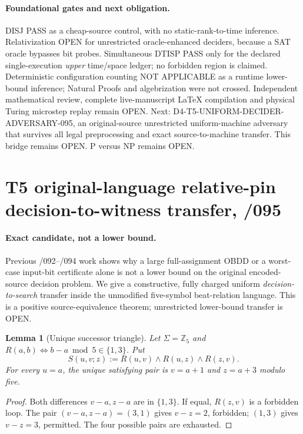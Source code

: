 \documentclass[11pt]{article}
\newtheorem{lemma}{Lemma}
\begin{document}
\paragraph{Foundational gates and next obligation.}
DISJ PASS as a cheap-source control, with no static-rank-to-time
inference. Relativization OPEN for unrestricted oracle-enhanced
deciders, because a SAT oracle bypasses bit probes. Simultaneous
DTISP PASS only for the declared single-execution \emph{upper}
time/space ledger; no forbidden region is claimed. Deterministic
configuration counting NOT APPLICABLE as a runtime lower-bound
inference; Natural Proofs and algebrization were not crossed.
Independent mathematical review, complete live-manuscript LaTeX
compilation and physical Turing microstep replay remain OPEN.
Next: D4-T5-UNIFORM-DECIDER-ADVERSARY-095, an original-source
unrestricted uniform-machine adversary that survives all legal
preprocessing and exact source-to-machine transfer. This bridge
remains OPEN. P versus NP remains OPEN.


\section{T5 original-language relative-pin decision-to-witness transfer, /095}
\label{sec:t5-pin095}
\paragraph{Exact candidate, not a lower bound.}
Previous /092--/094 work shows why a large full-assignment
OBDD or a worst-case input-bit certificate alone is not a lower
bound on the original encoded-source decision problem.
We give a constructive, fully charged uniform
\emph{decision-to-search} transfer inside the unmodified
five-symbol beat-relation language. This is a positive
source-equivalence theorem; unrestricted lower-bound transfer is OPEN.

\begin{lemma}[Unique successor triangle]
Let $\Sigma=\mathbb Z_5$ and
$R(a,b)\iff b-a\bmod5\in\{1,3\}$. Put
\[
 S(u,v;z):=R(u,v)\wedge R(u,z)\wedge R(z,v).
\]
For every $u=a$, the unique satisfying pair is
$v=a+1$ and $z=a+3$ modulo five.
\end{lemma}
\begin{proof}
Both differences $v-a,z-a$ are in $\{1,3\}$.
If equal, $R(z,v)$ is a forbidden loop.
The pair $(v-a,z-a)=(3,1)$ gives
$v-z=2$, forbidden; $(1,3)$ gives $v-z=3$, permitted.
The four possible pairs are exhausted.
\end{proof}
\end{document}
